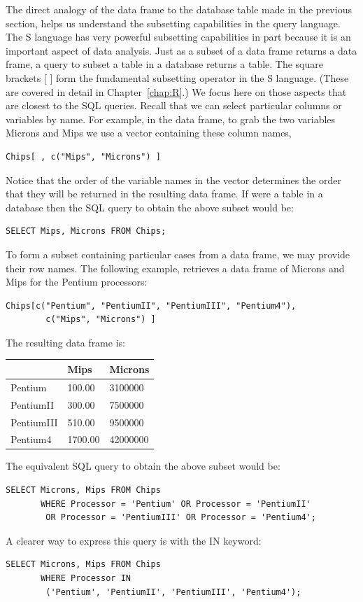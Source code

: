 The direct analogy of the data frame to the database table made
in the previous section, helps us understand the subsetting capabilities
in the query language.
The S language has very powerful subsetting capabilities in part
because it is an important aspect of data analysis. 
Just as a subset of a data frame returns a data frame, a query to subset
a table in a database returns a table.
The square brackets $[$ $]$ form the fundamental subsetting operator
in the S language.
(These are covered in detail in Chapter~\ref{chap:R}.)
We focus here on those aspects that are closest to the SQL queries.
Recall that we can select particular columns or variables by name.
For example, in the 
 data frame, to grab the two variables Microns and Mips
we use a vector containing these column names,
\begin{verbatim}
Chips[ , c("Mips", "Microns") ]
\end{verbatim}
Notice that the order of the variable names in the vector determines
the order that they will be returned in the resulting data frame.
If  were a table in a database then the 
SQL query to obtain the above subset would be:
\begin{verbatim}
SELECT Mips, Microns FROM Chips;
\end{verbatim}

To form a subset containing particular cases from a data frame, 
we may provide their row names.
The following example, retrieves a data frame of Microns and Mips 
for the Pentium processors:
\begin{verbatim}
Chips[c("Pentium", "PentiumII", "PentiumIII", "Pentium4"), 
        c("Mips", "Microns") ]
\end{verbatim}
The resulting data frame is:

\begin{table}[h]
\begin{tabular}{l|ll}
  & Mips & Microns\\
\hline
Pentium &   100.00 & 3100000 \\
PentiumII & 300.00 & 7500000 \\
PentiumIII & 510.00 & 9500000\\
Pentium4  & 1700.00 & 42000000\\
\hline
\end{tabular}
\end{table}

The equivalent SQL query to obtain the above subset would be:
\begin{verbatim}
SELECT Microns, Mips FROM Chips 
       WHERE Processor = 'Pentium' OR Processor = 'PentiumII'
        OR Processor = 'PentiumIII' OR Processor = 'Pentium4';
\end{verbatim}
A clearer way to express this query is with the IN keyword:
\begin{verbatim}
SELECT Microns, Mips FROM Chips 
       WHERE Processor IN 
        ('Pentium', 'PentiumII', 'PentiumIII', 'Pentium4');
\end{verbatim}

